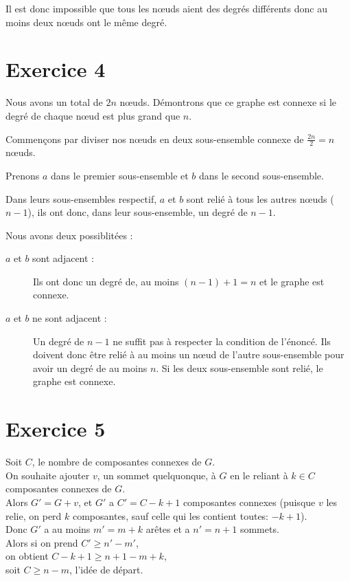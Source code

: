 \documentclass[fontsize=10pt]{article}
\begin{document}
Il est donc impossible que tous les nœuds aient des degrés
différents donc au moins deux nœuds ont le même degré.

\section*{Exercice 4}
Nous avons un total de $2n$ nœuds. Démontrons que ce graphe est connexe si le
degré de chaque nœud est plus grand que $n$.

Commençons par diviser nos nœuds en deux sous-ensemble connexe de
$\frac{2n}{2} = n$ nœuds.

Prenons $a$ dans le premier sous-ensemble et $b$
dans le second sous-ensemble.

Dans leurs sous-ensembles respectif, $a$ et $b$
sont relié à tous les autres nœuds ($n-1$), ils ont donc, dans leur sous-ensemble, un
degré de $n - 1$.

Nous avons deux possiblitées :
\begin{description}
    \item [$a$ et $b$ sont adjacent :]
        Ils ont donc un degré de, au moins $(n - 1) + 1 = n$ et le graphe est
        connexe.  \item [$a$ et $b$ ne sont adjacent :] Un degré de $n-1$ ne suffit pas à respecter la condition de l'énoncé.  Ils doivent donc être relié à au moins un nœud de l'autre sous-ensemble
        pour avoir un degré de au moins $n$. Si les deux sous-ensemble sont
        relié, le graphe est connexe.
\end{description}

\section*{Exercice 5}
Soit $C$, le nombre de composantes connexes de $G$.\\
On souhaite ajouter $v$, un sommet quelquonque, à $G$ en le reliant à $k\in{C}$ composantes connexes de $G$.\\
Alors $G' = G + v$, et $G'$ a $C'=C-k+1$ composantes connexes (puisque $v$ les relie, on perd $k$ composantes, sauf celle qui les contient toutes: $-k+1$).\\
Donc $G'$ a au moins $m'= m+k$ arêtes et a $n'=n+1$ sommets.\\
Alors si on prend $C'\geq n'- m'$,\\
on obtient $C-k+1 \geq n+1 - m+k$,\\
soit $C \geq n-m$, l'idée de départ.
\end{document}
